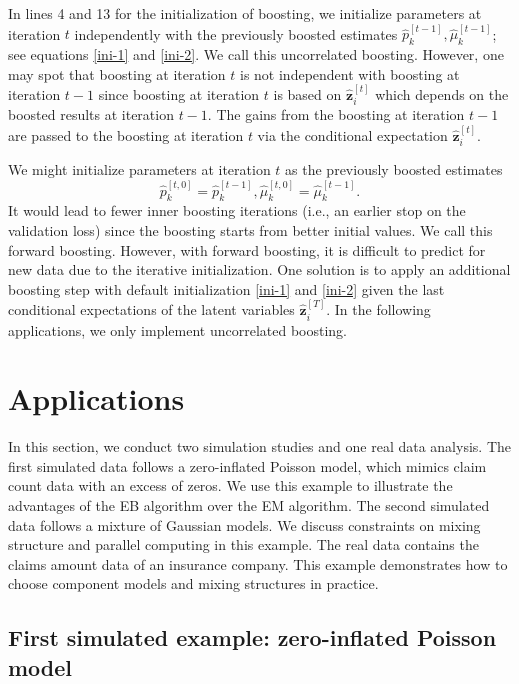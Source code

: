 \documentclass[11pt]{article}
\numberwithin{equation}{section}
\def\bz{\boldsymbol{z}}
\begin{document}
In lines 4 and 13 for the initialization of boosting, 
we initialize parameters at iteration $t$ {independently} with the previously boosted estimates $\hat{p}_k^{[t-1]}, \hat{\mu}_k^{[t-1]}$; see equations \eqref{ini-1} and \eqref{ini-2}. We call this uncorrelated boosting. However, one may spot that boosting at iteration $t$ is not independent with boosting at iteration $t-1$ 
since boosting at iteration $t$ is based on $\hat{\bz}_i^{[t]}$ which depends on the boosted results at iteration $t-1$. The gains from the boosting at iteration $t-1$ are passed to  the boosting at iteration $t$ via the conditional expectation $\hat{\bz}_i^{[t]}$. 
	
	We might initialize parameters at iteration $t$ as the previously boosted estimates $$\hat{p}_k^{[t,0]}=\hat{p}_k^{[t-1]}, \hat{\mu}_k^{[t,0]}=\hat{\mu}_k^{[t-1]}.$$
It would lead to fewer inner boosting iterations (i.e., an {earlier} stop on the validation loss) since the boosting starts from better initial values.
	We call this forward boosting. 
	However, with forward boosting, it is difficult to predict for new data due to the {iterative initialization}. 
	One solution is to apply an additional boosting step with default initialization \eqref{ini-1} and \eqref{ini-2} given the {last conditional expectations of the latent variables $\hat{\bz}^{[T]}_i$}. 
	In the following applications, we only implement uncorrelated boosting.

	
\section{Applications}\label{sec:application}

In this section, we conduct two simulation studies and one real data analysis. 
The first simulated data follows a zero-inflated Poisson model, which mimics claim count data with an excess of zeros.
We use this example to illustrate the advantages of the EB algorithm over the EM algorithm.
The second simulated data follows a mixture of Gaussian models. 
We discuss constraints on mixing structure and parallel computing in this example.
The real data contains the claims amount data of an insurance company. 
This example demonstrates how to choose component models and mixing structures in practice.

\subsection{First simulated example: zero-inflated Poisson model}
\end{document}
